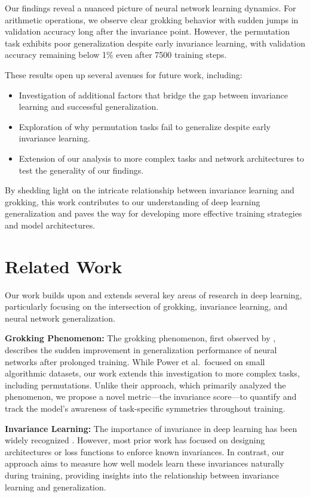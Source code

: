 \documentclass{article} %
\begin{document}
Our findings reveal a nuanced picture of neural network learning dynamics. For arithmetic operations, we observe clear grokking behavior with sudden jumps in validation accuracy long after the invariance point. However, the permutation task exhibits poor generalization despite early invariance learning, with validation accuracy remaining below 1\% even after 7500 training steps.

These results open up several avenues for future work, including:

\begin{itemize}
    \item Investigation of additional factors that bridge the gap between invariance learning and successful generalization.
    \item Exploration of why permutation tasks fail to generalize despite early invariance learning.
    \item Extension of our analysis to more complex tasks and network architectures to test the generality of our findings.
\end{itemize}

By shedding light on the intricate relationship between invariance learning and grokking, this work contributes to our understanding of deep learning generalization and paves the way for developing more effective training strategies and model architectures.

\section{Related Work}
\label{sec:related}
Our work builds upon and extends several key areas of research in deep learning, particularly focusing on the intersection of grokking, invariance learning, and neural network generalization.

\textbf{Grokking Phenomenon:} The grokking phenomenon, first observed by \citet{power2022grokking}, describes the sudden improvement in generalization performance of neural networks after prolonged training. While Power et al.\ focused on small algorithmic datasets, our work extends this investigation to more complex tasks, including permutations. Unlike their approach, which primarily analyzed the phenomenon, we propose a novel metric---the invariance score---to quantify and track the model's awareness of task-specific symmetries throughout training.

\textbf{Invariance Learning:} The importance of invariance in deep learning has been widely recognized \citep{goodfellow2016deep}. However, most prior work has focused on designing architectures or loss functions to enforce known invariances. In contrast, our approach aims to measure how well models learn these invariances naturally during training, providing insights into the relationship between invariance learning and generalization.
\end{document}
